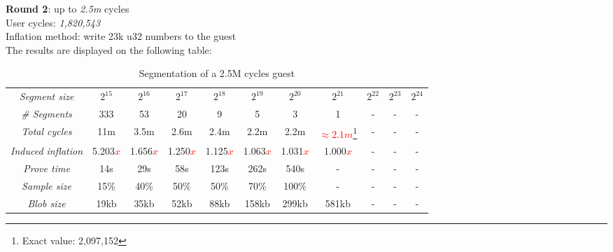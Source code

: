 \documentclass[a4paper, 10pt]{article}
\begin{document}
\par \noindent
\textbf{Round 2}: up to \textit{2.5m} cycles\\
User cycles: \textit{1,820,543}\\
Inflation method: write 23k u32 numbers to the guest\\
The results are displayed on the following table:
\begin{table}[H]
  	\begin{center}
    \label{tab:table3}
    \begin{minipage}{\textwidth}
    \begin{adjustbox}{width=\textwidth}
    \begin{tabular}{c|c|c|c|c|c|c|c|c|c|c}
	  \textit{Segment size} & $2^{15}$ & $2^{16}$ & $2^{17}$ & $2^{18}$ & $2^{19}$ & $2^{20}$ & $2^{21}$ & $2^{22}$ & $2^{23}$ & $2^{24}$\\
	  \textit{\# Segments} & 333 & 53 & 20 & 9 & 5 & 3 & 1 & - & - & -\\
	  \textit{Total cycles} & 11m & 3.5m & 2.6m & 2.4m & 2.2m & 2.2m & \textcolor{red}{$\approx 2.1m$}\footnote{Exact value: 2,097,152} & - & - & -\\
	  \textit{Induced inflation} & 5.203\textcolor{red}{$x$} & 1.656\textcolor{red}{$x$} & 1.250\textcolor{red}{$x$} & 1.125\textcolor{red}{$x$} & 1.063\textcolor{red}{$x$} & 1.031\textcolor{red}{$x$} & 1.000\textcolor{red}{$x$} & - & - & -\\
	  \textit{Prove time} & 14s & 29s & 58s & 123s & 262s & 540s & - & - & - & -\\
	  \textit{Sample size} & 15\% & 40\% & 50\% & 50\% & 70\% & 100\% & - & - & - & -\\
	  \textit{Blob size} & 19kb & 35kb & 52kb & 88kb &158kb & 299kb & 581kb & - & - & -\\
   	\end{tabular}
   	\end{adjustbox}
   	\end{minipage}
    \caption{Segmentation of a 2.5M cycles guest}
  \end{center}
\end{table}
\end{document}
